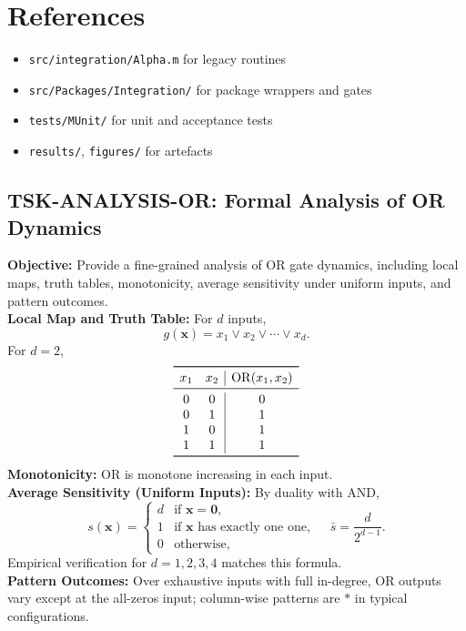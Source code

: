 \documentclass[11pt]{article}
\begin{document}
\section{References}
\begin{itemize}
\item \texttt{src/integration/Alpha.m} for legacy routines
\item \texttt{src/Packages/Integration/} for package wrappers and gates
\item \texttt{tests/MUnit/} for unit and acceptance tests
\item \texttt{results/}, \texttt{figures/} for artefacts
\end{itemize}



\subsection{TSK-ANALYSIS-OR: Formal Analysis of OR Dynamics}
\textbf{Objective:} Provide a fine-grained analysis of OR gate dynamics, including local maps, truth tables, monotonicity, average sensitivity under uniform inputs, and pattern outcomes.\\
\textbf{Local Map and Truth Table:} For \(d\) inputs,
\[
g(\mathbf{x}) = x_1 \lor x_2 \lor \cdots \lor x_d.
\]
For \(d=2\),
\[
\begin{array}{cc|c}
\toprule
 x_1 & x_2 & \mathrm{OR}(x_1,x_2) \\
\midrule
 0 & 0 & 0 \\
 0 & 1 & 1 \\
 1 & 0 & 1 \\
 1 & 1 & 1 \\
\bottomrule
\end{array}
\]
\textbf{Monotonicity:} OR is monotone increasing in each input.\\
\textbf{Average Sensitivity (Uniform Inputs):} By duality with AND,
\[
s(\mathbf{x}) = \begin{cases}
 d & \text{if } \mathbf{x}=\mathbf{0},\\
 1 & \text{if } \mathbf{x} \text{ has exactly one one},\\
 0 & \text{otherwise,}
\end{cases}\quad \bar{s} = \frac{d}{2^{d-1}}.
\]
Empirical verification for \(d=1,2,3,4\) matches this formula.\\
\textbf{Pattern Outcomes:} Over exhaustive inputs with full in-degree, OR outputs vary except at the all-zeros input; column-wise patterns are \(*\) in typical configurations.\\
\end{document}
